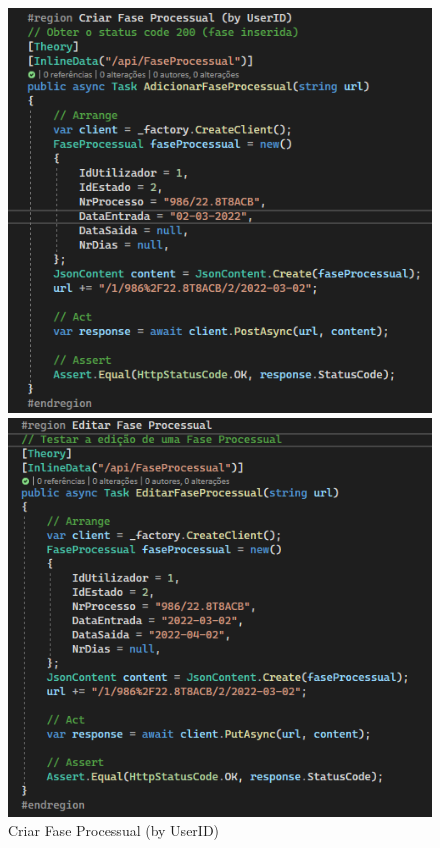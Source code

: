 \begin{figure}[!htbp]
  \centering
  \begin{minipage}[b]{0.4\textwidth}
    \includegraphics[width=\textwidth]{Figuras/TestesUnitarios/FaseProcessual/Criar Fase Processual.png}
    \caption{Criar Fase Processual (by UserID)}
    \label{d.unitario}
  \end{minipage}
  \hfill
  \begin{minipage}[b]{0.4\textwidth}
    \includegraphics[width=\textwidth]{Figuras/TestesUnitarios/FaseProcessual/Editar Fase Processual.png}

\end{minipage}
\end{figure}
